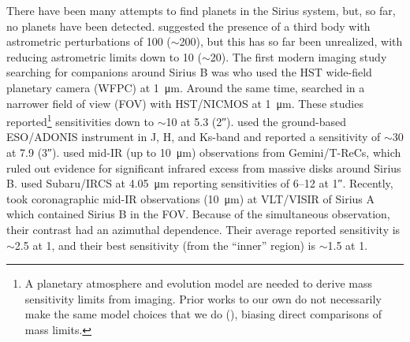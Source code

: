 \documentclass[twocolumn,linenumbers]{aastex631}
\begin{document}
There have been many attempts to find planets in the Sirius system, but, so far, no planets have been detected. \citet{benestSiriusTripleStar1995} suggested the presence of a third body with astrometric perturbations of \qty{100}{\milliarcsecond} ($\sim$\qty{200}{\jupitermass}), but this has so far been unrealized, with \citet{bondSiriusSystemIts2017} reducing astrometric limits down to \qty{10}{\milliarcsecond} ($\sim$\qty{20}{\jupitermass}). The first modern imaging study searching for companions around Sirius B was \citet{schroederSearchFaintCompanions2000} who used the HST wide-field planetary camera (WFPC) at \qty{1}{\micro\meter}. Around the same time, \citet{kuchnerSearchExozodiacalDust2000} searched in a narrower field of view (FOV) with HST/NICMOS at \qty{1}{\micro\meter}. These studies reported\footnote{A planetary atmosphere and evolution model are needed to derive mass sensitivity limits from imaging. Prior works to our own do not necessarily make the same model choices that we do (), biasing direct comparisons of mass limits.} sensitivities down to $\sim$\qty{10}{\jupitermass} at \qty{5.3}{\au} (\ang{;;2}).  \citet{bonnet-bidaudADONISHighContrast2008a} used the ground-based ESO/ADONIS instrument in J, H, and Ks-band and reported a sensitivity of $\sim$\qty{30}{\jupitermass} at \qty{7.9}{\au} (\ang{;;3}). \citet{skemerSiriusImagedMidinfrared2011} used mid-IR (up to \qty{10}{\micro\meter}) observations from Gemini/T-ReCs, which ruled out evidence for significant infrared excess from massive disks around Sirius B. \citet{thalmannPiercingGlareDirect2011} used Subaru/IRCS at \qty{4.05}{\micro\meter} reporting sensitivities of \qtyrange{6}{12}{\jupitermass} at \ang{;;1}. Recently, \citet{pathakHighContrastImaging2021} took coronagraphic mid-IR observations (\qty{10}{\micro\meter}) at VLT/VISIR of Sirius A which contained Sirius B in the FOV. Because of the simultaneous observation, their contrast had an azimuthal dependence. Their average reported sensitivity is $\sim$\qty{2.5}{\jupitermass} at \qty{1}{\au}, and their best sensitivity (from the ``inner'' region) is $\sim$\qty{1.5}{\jupitermass} at \qty{1}{\au}.
\end{document}
